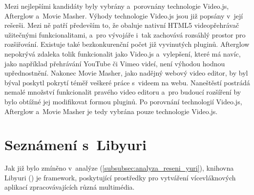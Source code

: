 \documentclass[thesis=M,czech]{FITthesis}[2012/06/26]
\begin{document}
Mezi nejlepšími kandidáty byly vybrány a~porovnány technologie Video.js, Afterglow a~Movie Masher. Výhody technologie Video.js jsou již popsány v~její rešerši. Mezi ně patří především to, že obaluje nativní HTML5 videopřehrávač užitečnými funkcionalitami, a~pro vývojáře i~tak zachovává rozsáhlý prostor pro rozšiřování. Existuje také bezkonkurenční počet již vyvinutých pluginů. Afterglow nepokrývá zdaleka tolik funkcionalit jako Video.js a~vylepšení, které má navíc, jako například přehrávání YouTube či Vimeo videí, není výhodou hodnou upřednostnění. Nakonec Movie Masher, jako nadějný webový video editor, by byl býval poskytl pokrytí téměř veškeré práce s~videem na webu. Naneštěstí postrádá nemalé množství funkcionalit pravého video editoru a~pro budoucí rozšíření by bylo obtížné jej modifikovat formou pluginů. Po porovnání technologií Video.js, Afterglow a~Movie Masher je tedy vybrána pouze technologie Video.js.

\section{Seznámení s~Libyuri} \label{sec:analyza_yuri}
Jak již bylo zmíněno v~analýze (\ref{subsubsec:analyza_reseni_yuri}), knihovna Libyuri (\cite{yuri}) je framework, poskytující prostředky pro vytváření vícevláknových aplikací zpracovávajících různá multimédia.
\end{document}
